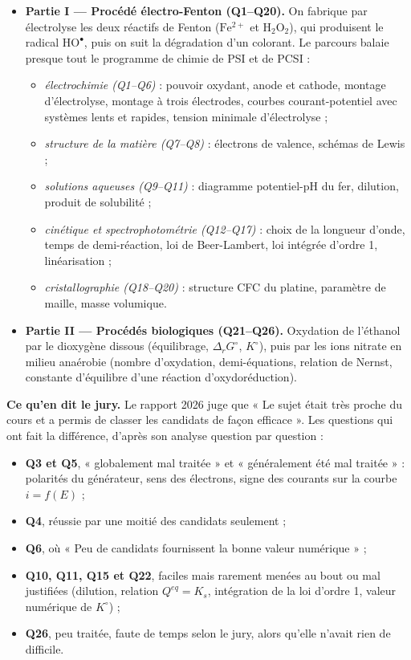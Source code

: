 \documentclass[11pt,a4paper]{article}
\providecommand{\tightlist}{\setlength{\itemsep}{0pt}\setlength{\parskip}{0pt}}
\begin{document}
\begin{itemize}
\tightlist
\item
  \textbf{Partie I --- Procédé électro-Fenton (Q1--Q20).} On fabrique par électrolyse les deux réactifs de Fenton (\(\mathrm{Fe^{2+}}\) et \(\mathrm{H_2O_2}\)), qui produisent le radical \(\mathrm{HO^\bullet}\), puis on suit la dégradation d'un colorant. Le parcours balaie presque tout le programme de chimie de PSI et de PCSI :

  \begin{itemize}
  \tightlist
  \item
    \emph{électrochimie (Q1--Q6)} : pouvoir oxydant, anode et cathode, montage d'électrolyse, montage à trois électrodes, courbes courant-potentiel avec systèmes lents et rapides, tension minimale d'électrolyse ;
  \item
    \emph{structure de la matière (Q7--Q8)} : électrons de valence, schémas de Lewis ;
  \item
    \emph{solutions aqueuses (Q9--Q11)} : diagramme potentiel-pH du fer, dilution, produit de solubilité ;
  \item
    \emph{cinétique et spectrophotométrie (Q12--Q17)} : choix de la longueur d'onde, temps de demi-réaction, loi de Beer-Lambert, loi intégrée d'ordre 1, linéarisation ;
  \item
    \emph{cristallographie (Q18--Q20)} : structure CFC du platine, paramètre de maille, masse volumique.
  \end{itemize}
\item
  \textbf{Partie II --- Procédés biologiques (Q21--Q26).} Oxydation de l'éthanol par le dioxygène dissous (équilibrage, \(\Delta_rG^\circ\), \(K^\circ\)), puis par les ions nitrate en milieu anaérobie (nombre d'oxydation, demi-équations, relation de Nernst, constante d'équilibre d'une réaction d'oxydoréduction).
\end{itemize}

\textbf{Ce qu'en dit le jury.} Le rapport 2026 juge que « Le sujet était très proche du cours et a permis de classer les candidats de façon efficace ». Les questions qui ont fait la différence, d'après son analyse question par question :

\begin{itemize}
\tightlist
\item
  \textbf{Q3 et Q5}, « globalement mal traitée » et « généralement été mal traitée » : polarités du générateur, sens des électrons, signe des courants sur la courbe \(i=f(E)\) ;
\item
  \textbf{Q4}, réussie par une moitié des candidats seulement ;
\item
  \textbf{Q6}, où « Peu de candidats fournissent la bonne valeur numérique » ;
\item
  \textbf{Q10, Q11, Q15 et Q22}, faciles mais rarement menées au bout ou mal justifiées (dilution, relation \(Q^{eq}=K_s\), intégration de la loi d'ordre 1, valeur numérique de \(K^\circ\)) ;
\item
  \textbf{Q26}, peu traitée, faute de temps selon le jury, alors qu'elle n'avait rien de difficile.
\end{itemize}
\end{document}
